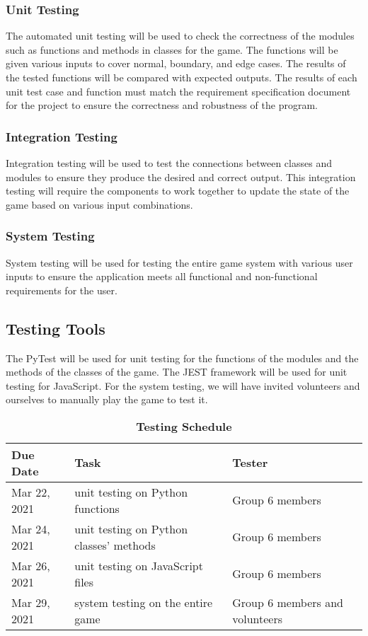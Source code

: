 \documentclass[12pt, titlepage]{article}
\begin{document}
\subsubsection{Unit Testing}
The automated unit testing will be used to check the correctness of the modules such as functions and methods in classes for the game. The functions will be given various inputs to cover normal, boundary, and edge cases. The results of the tested functions will be compared with expected outputs. The results of each unit test case and function must match the requirement specification document for the project to ensure the correctness and robustness of the program.

\subsubsection{Integration Testing}
Integration testing will be used to test the connections between classes and modules to ensure they produce the desired and correct output. This integration testing will require the components to work together to update the state of the game based on various input combinations.

\subsubsection{System Testing}
System testing will be used for testing the entire game system with various user inputs to ensure the application meets all functional and non-functional requirements for the user.

\subsection{Testing Tools}
The PyTest will be used for unit testing for the functions of the modules and the methods of the classes of the game. The JEST framework will be used for unit testing for JavaScript. For the system testing, we will have invited volunteers and ourselves to manually play the game to test it.


\begin{table}[hbp]
\caption{\textbf{Testing Schedule}} \label{Table}
\begin{tabularx}{\textwidth}{| X | X | X |} 
\hline
Due Date & Task & Tester \\ \hline
 Mar 22, 2021 & unit testing on Python functions & Group 6 members \\ \hline
 Mar 24, 2021 & unit testing on Python classes' methods  & Group 6 members \\ \hline
 Mar 26, 2021 & unit testing on JavaScript files & Group 6 members \\ \hline
 Mar 29, 2021 & system testing on the entire game & Group 6 members and volunteers \\
\hline
\end{tabularx}
\end{table}
\end{document}
